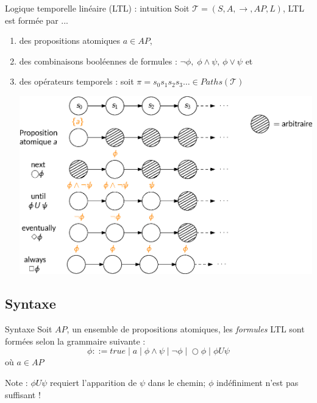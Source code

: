 \documentclass[compress]{beamer}
\begin{document}
\begin{frame}{Logique temporelle linéaire (LTL) : intuition}
  \vspace{-0.04\linewidth}
  \footnotesize
  Soit $\mathcal{T} = (S, A, \rightarrow, AP, L)$,
  LTL est formée par ...
  \begin{enumerate}
    \item des propositions atomiques $a \in AP$,
    \item des combinaisons booléennes de formules :
    $
      \neg \phi, \; \phi \wedge \psi, \, \phi \vee \psi
    $
     et
    \item des opérateurs temporels : soit $\pi = s_0s_1s_2s_3\dots \in Paths(\mathcal{T})$
    \begin{center}
      \includegraphics[width=0.8\linewidth]{resources/LTL}
    \end{center}
  \end{enumerate}
\end{frame}

\subsection{Syntaxe}
\begin{frame}
\begin{block}{Syntaxe}
Soit $AP$, un ensemble de propositions atomiques, les \textit{\color{fibeamer@orange}formules} LTL sont formées selon la {\color{fibeamer@orange}grammaire} suivante :
\[
  \phi ::= true \; | \; a \; | \; \phi \wedge \psi \; | \; \neg \phi \; | \; \bigcirc \phi \; | \; \phi U \psi
\]
où $a \in AP$
\end{block}
  \alert{Note : $\phi U \psi$ requiert l'apparition de $\psi$ dans le chemin; $\phi$ indéfiniment n'est pas suffisant !}

\end{frame}
\end{document}
